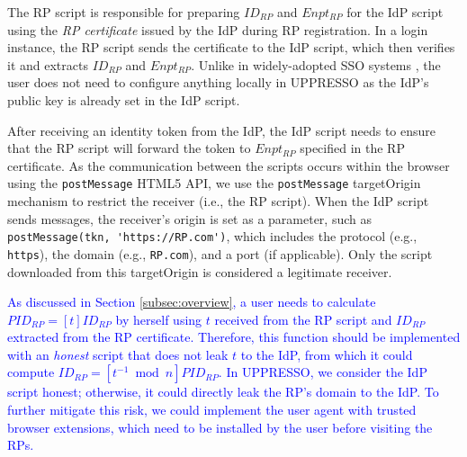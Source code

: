 
The RP script is responsible for preparing $ID_{RP}$ and $Enpt_{RP}$ for the IdP script using the \emph{RP certificate} issued by the IdP during RP registration. %
In a login instance, the RP script sends the certificate to the IdP script, which then verifies it and extracts $ID_{RP}$ and $Enpt_{RP}$. Unlike in widely-adopted SSO systems \cite{OpenIDConnect, rfc6749, SAML, SAMLIdentifier}, the user does not need to configure anything locally in UPPRESSO as the IdP's public key is already set in the IdP script.

After receiving an identity token from the IdP, the IdP script needs to ensure that the RP script will forward the token to $Enpt_{RP}$ %
specified in the RP certificate.
As the communication between the scripts occurs within the browser using the \verb+postMessage+ HTML5 API, %
we use the \verb+postMessage+ targetOrigin mechanism \cite{postm-targeto} to restrict the receiver (i.e., the RP script). When the IdP script sends messages, the receiver's origin is set as a parameter, such as \verb+postMessage(tkn, 'https://RP.com')+, which includes the protocol (e.g., \verb+https+), the domain (e.g., \verb+RP.com+), and a port (if applicable). Only the script downloaded from this targetOrigin is considered a legitimate receiver.


\textcolor{blue}{As discussed in Section \ref{subsec:overview}, a user needs to calculate $PID_{RP} = [t]ID_{RP}$ by herself using $t$ received from the RP script and $ID_{RP}$ extracted from the RP certificate. Therefore, this function should be implemented with an \emph{honest} script that does not leak $t$ to the IdP, from which it could compute $ID_{RP} = [t^{-1}\bmod n]PID_{RP}$. In UPPRESSO, we consider the IdP script honest; otherwise, it could directly leak the RP's domain to the IdP. To further mitigate this risk, we could implement the user agent with trusted browser extensions, which need to be installed by the user before visiting the RPs.
}

